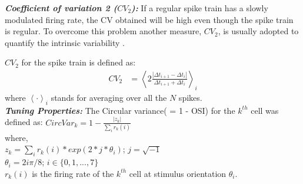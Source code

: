 \textbf{\textit{Coefficient of variation 2 ($CV_2$):}}
If a regular spike train has a slowly modulated firing rate, the CV obtained will be high even though the spike train is regular. To overcome this problem another measure, $CV_2$,  is usually adopted to quantify the intrinsic variability \cite{Holt1996}.

$CV_2$ for the spike train is defined as: \\
\begin{align}
CV_{2} &= \left\langle 2 \frac{|\Delta t_{i+1} - \Delta t_{i}|}{\Delta t_{i+1} + \Delta t_{i}} \right\rangle_{i}
\end{align}
where $\left\langle \cdot \right\rangle_{i}$ stands for averaging over all the $N$ spikes. \\

\textbf{\textit{Tuning Properties:}}
The Circular variance( = 1 - OSI) for the $k^{th}$ cell was defined as: $CircVar_{k} = 1 - \frac{|z_k|}{\sum_i r_k(i) }$\\ where,\\
 $z_k = \sum_i r_k(i)*exp(2*j*\theta_i)$;    $j = \sqrt{-1}$\\
 $\theta_i = 2i\pi/8$;    $i \in \{0,1, ..., 7\}$\\
 $r_k(i)$ is the firing rate of the $k^{th}$ cell at stimulus orientation $\theta_{i}$.\\
